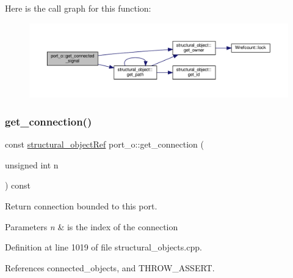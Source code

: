 Here is the call graph for this function\+:
\nopagebreak
\begin{figure}[H]
\begin{center}
\leavevmode
\includegraphics[width=350pt]{df/d75/structport__o_aa6bb158d117116992b5d19e9af2b59b8_cgraph}
\end{center}
\end{figure}
\mbox{\label{structport__o_a55e9ec7a31da21298c60c177634f8407}} 
\subsubsection{\texorpdfstring{get\+\_\+connection()}{get\_connection()}}
{\footnotesize\ttfamily const \hyperlink{structural__objects_8hpp_a8ea5f8cc50ab8f4c31e2751074ff60b2}{structural\+\_\+object\+Ref} port\+\_\+o\+::get\+\_\+connection (\begin{DoxyParamCaption}\item[{unsigned int}]{n }\end{DoxyParamCaption}) const}



Return connection bounded to this port. 


\begin{DoxyParams}{Parameters}
{\em n} & is the index of the connection \\
\hline
\end{DoxyParams}


Definition at line 1019 of file structural\+\_\+objects.\+cpp.



References connected\+\_\+objects, and T\+H\+R\+O\+W\+\_\+\+A\+S\+S\+E\+RT.

\mbox{\label{structport__o_a97fbec658342d6a3a918f5956e50c718}} 
